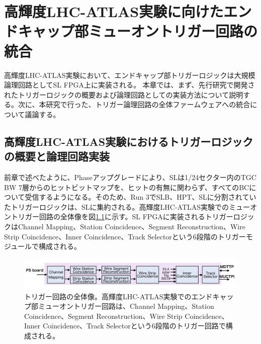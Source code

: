 \chapter{高輝度LHC-ATLAS実験に向けたエンドキャップ部ミューオントリガー回路の統合}
\label{chap_TriggerIntegration}
高輝度LHC-ATLAS実験において、エンドキャップ部トリガーロジックは大規模論理回路としてSL FPGA上に実装される。
本章では、まず、先行研究で開発されたトリガーロジックの概要および論理回路としての実装方法について説明する。次に、本研究で行った、トリガー論理回路の全体ファームウェアへの統合について議論する。

\section{高輝度LHC-ATLAS実験におけるトリガーロジックの概要と論理回路実装}
\label{sec_Phase2TriggerLogic}
前章で述べたように、Phase\two アップグレードにより、SLは1/24セクター内のTGC BW 7層からのヒットビットマップを、ヒットの有無に関わらず、すべてのBCについて受信するようになる。そのため、Run 3でSLB、HPT、SLに分割されていたトリガーロジックは、SLに集約される。高輝度LHC-ATLAS実験でのミューオントリガー回路の全体像を図\ref{Trigger_over}に示す。SL FPGAに実装されるトリガーロジックはChannel Mapping、Station Coincidence、Segment Reconstruction、Wire Strip Coincidence、Inner Coincidence、Track Selectorという6段階のトリガーモジュールで構成される。

\begin{figure} 
\centering
\includegraphics[width=16cm]{fig/SL/Trigger_over.png}
\caption[トリガー回路の全体像]{トリガー回路の全体像。高輝度LHC-ATLAS実験でのエンドキャップ部ミューオントリガー回路は、Channel Mapping、Station Coincidence、Segment Reconstruction、Wire Strip Coincidence、Inner Coincidence、Track Selectorという6段階のトリガー回路で構成される。}
\label{Trigger_over}
\end{figure}

